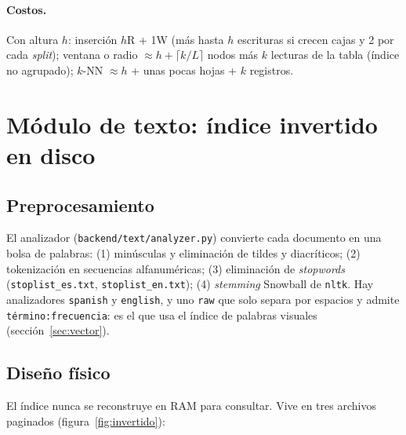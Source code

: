 \documentclass[11pt,a4paper]{article}
\newcommand{\code}[1]{\texttt{#1}}
\begin{document}
\paragraph{Costos.} Con altura $h$: inserción $h$R + 1W (más hasta $h$ escrituras si crecen cajas y
2 por cada \emph{split}); ventana o radio $\approx h + \lceil k/L\rceil$ nodos más $k$ lecturas de la
tabla (índice no agrupado); $k$-NN $\approx h$ + unas pocas hojas + $k$ registros.

\section{Módulo de texto: índice invertido en disco}
\label{sec:texto}

\subsection{Preprocesamiento}

El analizador (\code{backend/text/analyzer.py}) convierte cada documento en una bolsa de palabras:
(1) minúsculas y eliminación de tildes y diacríticos; (2) tokenización en secuencias alfanuméricas;
(3) eliminación de \emph{stopwords} (\code{stoplist\_es.txt}, \code{stoplist\_en.txt}); (4)
\emph{stemming} Snowball de \code{nltk}. Hay analizadores \code{spanish} y \code{english}, y uno
\code{raw} que solo separa por espacios y admite \code{término:frecuencia}: es el que usa el índice
de palabras visuales (sección~\ref{sec:vector}).

\subsection{Diseño físico}

El índice nunca se reconstruye en RAM para consultar. Vive en tres archivos paginados
(figura~\ref{fig:invertido}):
\end{document}
